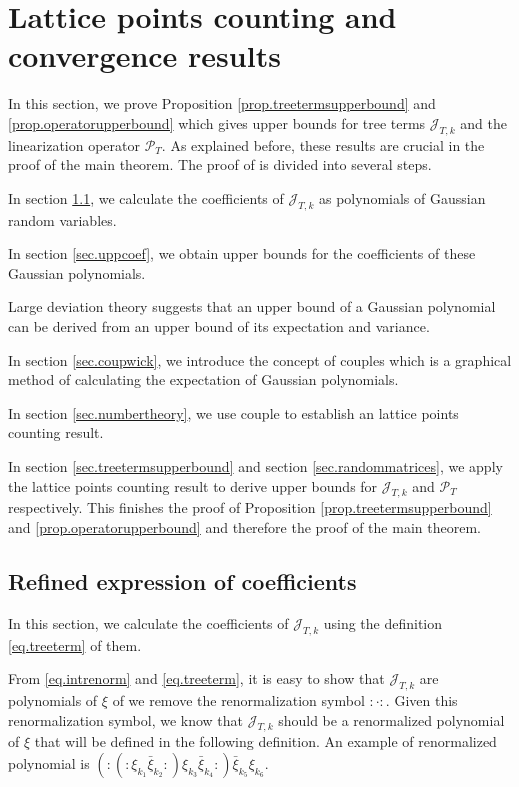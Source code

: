 \section{Lattice points counting and convergence results}
In this section, we prove Proposition \ref{prop.treetermsupperbound} and \ref{prop.operatorupperbound} which gives upper bounds for tree terms $\mathcal{J}_{T,k}$ and the linearization operator $\mathcal{P}_T$. As explained before, these results are crucial in the proof of the main theorem. The proof of is divided into several steps.

In section \ref{sec.refexp}, we calculate the coefficients of $\mathcal{J}_{T,k}$ as polynomials of Gaussian random variables.

In section \ref{sec.uppcoef}, we obtain upper bounds for the coefficients of these Gaussian polynomials.

Large deviation theory suggests that an upper bound of a Gaussian polynomial can be derived from an upper bound of its expectation and variance.

In section \ref{sec.coupwick}, we introduce the concept of couples which is a graphical method of calculating the expectation of Gaussian polynomials.

In section \ref{sec.numbertheory}, we use couple to establish an lattice points counting result.

In section \ref{sec.treetermsupperbound} and section \ref{sec.randommatrices}, we apply the lattice points counting result to derive upper bounds for  $\mathcal{J}_{T,k}$ and $\mathcal{P}_T$ respectively. This finishes the proof of Proposition \ref{prop.treetermsupperbound} and \ref{prop.operatorupperbound} and therefore the proof of the main theorem.



\subsection{Refined expression of coefficients}\label{sec.refexp} In this section, we calculate the coefficients of $\mathcal{J}_{T,k}$ using the definition \eqref{eq.treeterm} of them.



From \eqref{eq.intrenorm} and \eqref{eq.treeterm}, it is easy to show that $\mathcal{J}_{T,k}$ are polynomials of $\xi$ of we remove the renormalization symbol $:\cdot:$. Given this renormalization symbol, we know that $\mathcal{J}_{T,k}$ should be a renormalized polynomial of $\xi$ that will be defined in the following definition. An example of renormalized polynomial is $(:(:\xi_{k_1}\bar{\xi}_{k_2}:)\xi_{k_3}\bar{\xi}_{k_4}:)\bar{\xi}_{k_5}\xi_{k_6}$.

